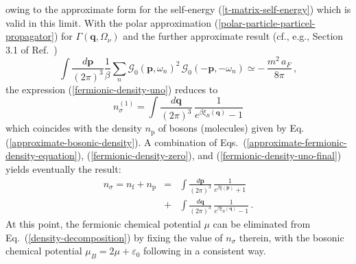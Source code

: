 \documentclass[pra,twocolumn,aps,amssymb,showpacs,superscriptaddress]{revtex4-1}
\begin{document}
owing to the approximate form for the self-energy (\ref{t-matrix-self-energy}) which is valid in this limit.
With the polar approximation (\ref{polar-particle-particel-propagator}) for $\Gamma(\mathbf{q},\Omega_{\nu})$ and the further approximate result (cf., e.g., Section 3.1 of Ref.~\cite{Physics-Reports-2018})
\begin{equation}
 \int \! \frac{d\mathbf{p}}{(2 \pi)^{3}} \frac{1}{\beta} \sum_{n} \mathcal{G}_{0}(\mathbf{p},\omega_{n})^{2}\,  \mathcal{G}_{0}(-\mathbf{p},-\omega_{n}) \simeq - \, \frac{m^{2} \, a_{F}}{8 \pi} \, ,
\label{further-approximation}
\end{equation}
the expression (\ref{fermionic-density-uno}) reduces to 
\begin{equation}
n_{\sigma}^{(1)} = \int \! \frac{d\mathbf{q}}{(2 \pi)^{3}} \, \frac{1}{e^{\beta \xi_{B}(\mathbf{q})} - 1}
\label{fermionic-density-uno-final}
\end{equation}
which coincides with the density $n_{\mathrm{p}}$ of bosons (molecules) given by Eq.(\ref{approximate-bosonic-density}).
A combination of Eqs.~(\ref{approximate-fermionic-density-equation}), (\ref{fermionic-density-zero}), and (\ref{fermionic-density-uno-final}) yields eventually the result:
\begin{eqnarray}
n_{\sigma} = n_{\mathrm{f}} + n_{\mathrm{p}} & = & \int \! \frac{d\mathbf{p}}{(2 \pi)^{3}} \, \frac{1}{e^{\beta \xi(\mathbf{p})} + 1}
\nonumber \\
& + & \int \! \frac{d\mathbf{q}}{(2 \pi)^{3}} \, \frac{1}{e^{\beta \xi_{B}(\mathbf{q})} - 1} \, .
\label{density-decomposition}
\end{eqnarray}
At this point, the fermionic chemical potential $\mu$ can be eliminated from Eq.~(\ref{density-decomposition}) by fixing the value of $n_{\sigma}$ therein, with the bosonic chemical potential 
$\mu_{B} = 2 \mu + \varepsilon_{0}$ following in a consistent way.
\end{document}
